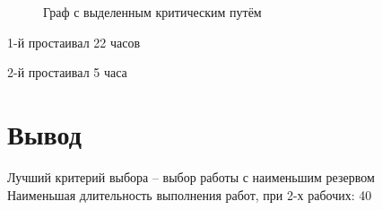 \documentclass[a4paper,14pt]{extarticle}
\begin{document}
\begin{figure}[h]
\caption{Граф с выделенным критическим путём}
\label{ris:image}
\end{figure}

1-й простаивал 22 часов

2-й простаивал 5 часа


\section{Вывод}

Лучший критерий выбора -- выбор работы с наименьшим резервом\\
Наименьшая длительность выполнения работ, при 2-х рабочих: 40
\end{document}
